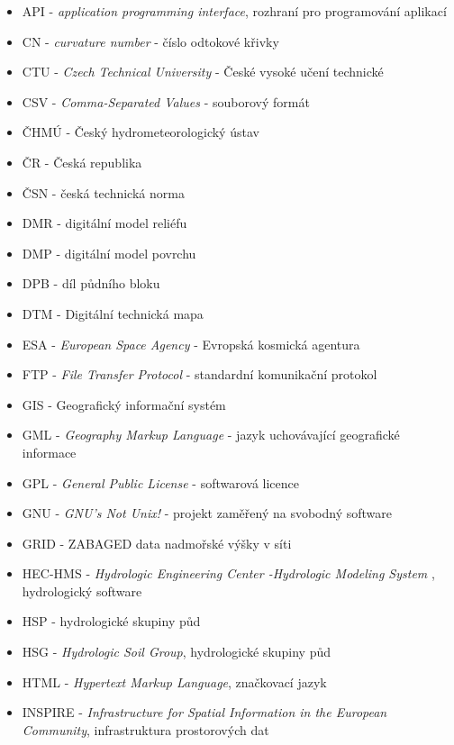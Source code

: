\documentclass[a4paper,oneside,12pt]{book}
\begin{document}
\begin{itemize}
  \item API - \textit{application programming interface}, rozhraní pro programování aplikací
  \item CN - \textit{curvature number} - číslo odtokové křivky
  \item CTU - \textit{Czech Technical University} - České vysoké učení technické
  \item CSV - \textit{Comma-Separated Values} - souborový formát
  \item ČHMÚ - Český hydrometeorologický ústav
  \item ČR - Česká republika
  \item ČSN - česká technická norma
  \item DMR - digitální model reliéfu
  \item DMP - digitální model povrchu
  \item DPB - díl půdního bloku
  \item DTM - Digitální technická mapa
  \item ESA - \textit{European Space Agency} - Evropská kosmická agentura
  \item FTP - \textit{File Transfer Protocol} - standardní komunikační protokol
  \item GIS - Geografický informační systém
  \item GML - \textit{Geography Markup Language} - jazyk uchovávající geografické informace
  \item GPL - \textit{General Public License} - softwarová licence 
  \item GNU - \textit{GNU's Not Unix!} - projekt zaměřený na svobodný software
  \item GRID - ZABAGED data nadmořské výšky v síti
  \item HEC-HMS - \textit{Hydrologic Engineering Center -Hydrologic Modeling System },  hydrologický software
  \item HSP - hydrologické skupiny půd
  \item HSG - \textit{Hydrologic Soil Group}, hydrologické skupiny půd
  \item HTML - \textit{Hypertext Markup Language}, značkovací jazyk
  \item INSPIRE - \textit{Infrastructure for Spatial Information in the European Community}, infrastruktura prostorových dat
  

\end{itemize}
\end{document}

